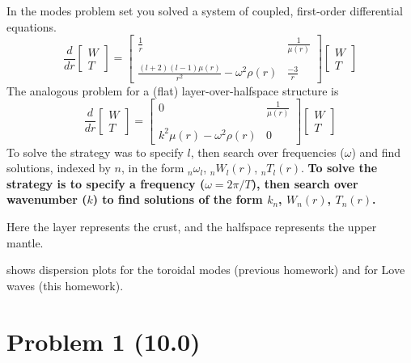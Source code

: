 \documentclass[11pt,titlepage,fleqn]{article}
\begin{document}
In the modes problem set you solved a system of coupled, first-order differential equations.
%
\begin{equation}
\frac{d}{dr}
\left[ \begin{array}{c} W \\ T \end{array} \right]
=
\left[ \begin{array}{cc}
\frac{1}{r} & \frac{1}{\mu(r)} \\
& \\
\frac{(l+2)(l-1)\mu(r)}{r^2} -\omega^2\rho(r)  & \frac{-3}{r}
\end{array} \right]
\left[ \begin{array}{c} W \\ T \end{array} \right]
\label{ODEs}
\end{equation}
%
The analogous problem for a (flat) layer-over-halfspace structure is
%
\begin{equation}
\frac{d}{dr}
\left[ \begin{array}{c} W \\ T \end{array} \right]
=
\left[ \begin{array}{cc}
0 & \frac{1}{\mu(r)} \\
& \\
k^2 \mu(r)-\omega^2\rho(r) & 0
\end{array} \right]
\left[ \begin{array}{c} W \\ T \end{array} \right]
\label{rODEs}
\end{equation}
%
To solve  the strategy was to specify $l$, then search over frequencies ($\omega$) and find solutions, indexed by $n$, in the form $_n\omega_l$, $_nW_l(r)$, $_nT_l(r)$. {\bf To solve  the strategy is to specify a frequency ($\omega = 2\pi/T$), then search over wavenumber ($k$) to find solutions of the form $k_n$, $W_n(r)$, $T_n(r)$.}

Here the layer represents the crust, and the halfspace represents the upper mantle.

 shows dispersion plots for the toroidal modes (previous homework) and for Love waves (this homework).


\section*{Problem 1 (10.0)}
\end{document}
